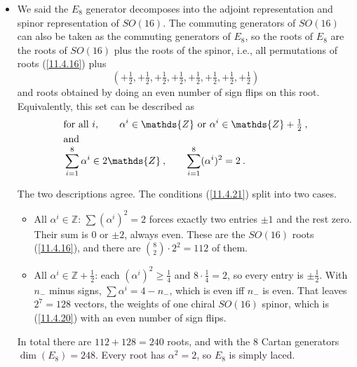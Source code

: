 \begin{itemize}
	\begin{equation}
		(+1,-1,0^{n-2})  \label{11.4.19}
	\end{equation}
	of all permutations. Note that all roots reside on the hyperplane $\sum_{i} a^{i}=0$; this is because all eigenvalues of the $U(1)$ generator are zero. The roots of $SU(n)$ are those in $U(n)$ considered to reside on this hyperplane.
	\item We said the $E_{8}$ generator decomposes into the adjoint representation and spinor representation of $SO(16)$. The commuting generators of $SO(16)$ can also be taken as the commuting generators of $E_{8}$, so the roots of $E_{8}$ are the roots of $SO(16)$ plus the roots of the spinor, i.e., all permutations of roots (\ref{11.4.16}) plus
	\begin{equation}
		(+\tfrac{1}{2},+\tfrac{1}{2},+\tfrac{1}{2},+\tfrac{1}{2},+\tfrac{1}{2},
		+\tfrac{1}{2},+\tfrac{1}{2},+\tfrac{1}{2}) \label{11.4.20}
	\end{equation}
	and roots obtained by doing an even number of sign flips on this root. Equivalently, this set can be described as
	\begin{subequations}
		\begin{align}
			&\text{for all } i,\qquad \alpha^{i}\in \mathds{Z} \text{ or } \alpha^{i}\in\mathds{Z}+\tfrac{1}{2}\:,
			\label{11.4.21a} \\
			\noalign{\hbox{and}}
			&\sum_{i=1}^{8}\alpha^{i}\in 2\mathds{Z}\:,\qquad \sum_{i=1}^{8}(\alpha^{i})^{2}=2 \:. \label{11.4.21b}
		\end{align}
	\end{subequations} \label{11.4.21}
	\begin{tcolorbox}[breakable]
		\begin{remark}
			The two descriptions agree. The conditions (\ref{11.4.21}) split into two cases.
			\begin{itemize}
				\item All $\alpha^{i}\in\mathds{Z}$: $\sum(\alpha^{i})^{2}=2$ forces exactly two entries $\pm1$ and the rest zero. Their sum is $0$ or $\pm2$, always even. These are the $SO(16)$ roots (\ref{11.4.16}), and there are $\binom{8}{2}\cdot2^{2}=112$ of them.
				\item All $\alpha^{i}\in\mathds{Z}+\frac{1}{2}$: each $(\alpha^{i})^{2}\geq\frac{1}{4}$ and $8\cdot\frac{1}{4}=2$, so every entry is $\pm\frac{1}{2}$. With $n_{-}$ minus signs, $\sum\alpha^{i}=4-n_{-}$, which is even iff $n_{-}$ is even. That leaves $2^{7}=128$ vectors, the weights of one chiral $SO(16)$ spinor, which is (\ref{11.4.20}) with an even number of sign flips.
			\end{itemize}
			In total there are $112+128=240$ roots, and with the $8$ Cartan generators $\operatorname{dim}(E_{8})=248$. Every root has $\alpha^{2}=2$, so $E_{8}$ is simply laced.
		\end{remark}
	\end{tcolorbox}
\end{itemize}

